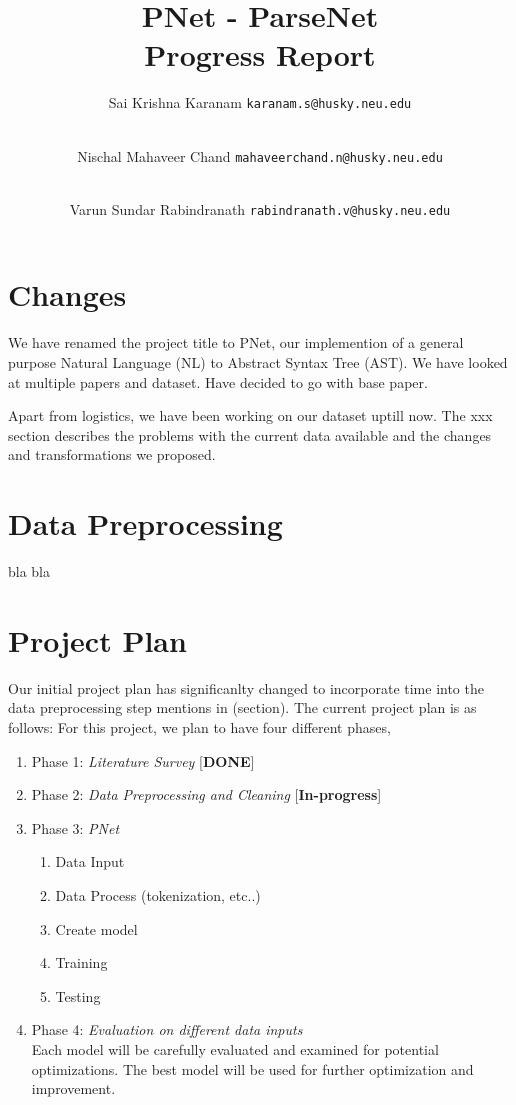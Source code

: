 \documentclass{IEEEtran}
\title{\textbf{PNet - ParseNet \\ \large{Progress Report}}}
\author{
    Sai Krishna Karanam 
    \texttt{karanam.s@husky.neu.edu}
    \and \\
    Nischal Mahaveer Chand 
    \texttt{mahaveerchand.n@husky.neu.edu}
    \and \\
    Varun Sundar Rabindranath 
    \texttt{rabindranath.v@husky.neu.edu}
}
\date{}
\begin{document}
    \maketitle

    \section{Changes}

    We have renamed the project title to PNet, our implemention of a general purpose
    Natural Language (NL) to Abstract Syntax Tree (AST). We have looked at multiple 
    papers and dataset. Have decided to go with base paper. 

    Apart from logistics, we have been working on our dataset uptill now. The
    xxx section describes the problems with the current data available and the changes 
    and transformations we proposed.
    
    \section{Data Preprocessing}

    bla bla

    \section{Project Plan}
    Our initial project plan has significanlty changed to incorporate time into the data 
    preprocessing step mentions in (section). The current project plan is as follows:
    For this project, we plan to have four different phases,
    \begin{enumerate}
        \item Phase 1: \textit{Literature Survey} [\textbf{DONE}] \\
        \item Phase 2: \textit{Data Preprocessing and Cleaning} [\textbf{In-progress}] \\
        \item Phase 3: \textit{PNet}
            \begin{enumerate}
                \item Data Input
                \item Data Process (tokenization, etc..)
                \item Create model
                \item Training
                \item Testing \\
            \end{enumerate}
        \item Phase 4: \textit{Evaluation on different data inputs} \\
            Each model will be carefully evaluated and examined for potential optimizations.
            The best model will be used for further optimization and improvement.
    \end{enumerate}
\end{document}
